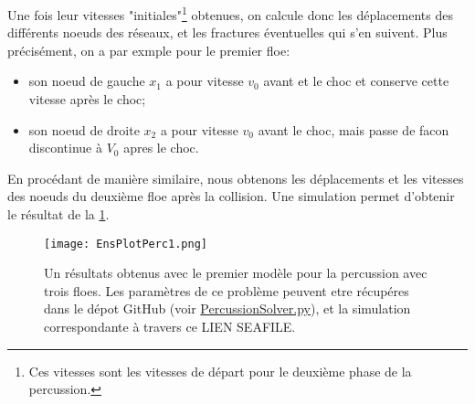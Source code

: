 Une fois leur vitesses "initiales"\footnote{Ces vitesses sont les vitesses de départ pour le deuxième phase de la percussion.} obtenues, on calcule donc les déplacements des différents noeuds des réseaux, et les fractures éventuelles qui s'en suivent. Plus précisément, on a par exmple pour le premier floe:
\begin{itemize}
    \item son noeud de gauche $x_1$ a pour vitesse $v_0$ avant et le choc et conserve cette vitesse après le choc;
    \item son noeud de droite $x_2$ a pour vitesse $v_0$ avant le choc, mais passe de facon discontinue à $V_0$ apres le choc.
\end{itemize}
En procédant de manière similaire, nous obtenons les déplacements et les vitesses des noeuds du deuxième floe après la collision. Une simulation permet d'obtenir le résultat de la \cref{fig:frac1d3}.
\begin{figure}[!h]
    \centering
    \texttt{[image: EnsPlotPerc1.png]}
    \caption{Un résultats obtenus avec le premier modèle pour la percussion avec trois floes. Les paramètres de ce problème peuvent etre récupéres dans le dépot GitHub (voir \href{https://github.com/desmond-rn/ice-floes/blob/master/code/simu1D/PercussionSolver.py}{PercussionSolver.py}), et la simulation correspondante à travers ce LIEN SEAFILE.}
    \label{fig:frac1d3}
\end{figure}





